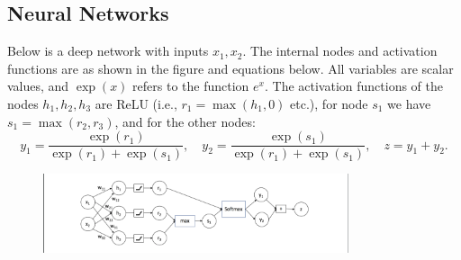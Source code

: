 \documentclass[a3paper,12pt]{extarticle} %
\begin{document}
\begin{enumerate}
\section{Neural Networks}
Below is a deep network with inputs $x_1, x_2$. The internal nodes and activation functions are as shown in the figure and equations below. All variables are scalar values, and $\exp(x)$ refers to the function $e^x$. The activation functions of the nodes $h_1, h_2, h_3$ are ReLU (i.e., $r_1 = \max(h_1, 0)$ etc.), for node $s_1$ we have $s_1 = \max(r_2, r_3)$, and for the other nodes:
\[
y_1 = \frac{\exp(r_1)}{\exp(r_1) + \exp(s_1)}, \quad y_2 = \frac{\exp(s_1)}{\exp(r_1) + \exp(s_1)}, \quad z = y_1 + y_2.
\]
\begin{figure}[h]
    \centering
    \includegraphics[width=0.8\textwidth]{Neural.png}


\end{figure}
\end{enumerate}
\end{document}
